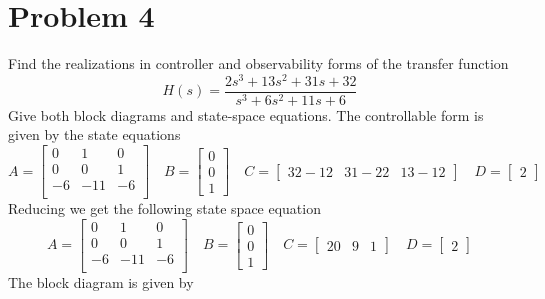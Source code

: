 \documentclass{article}
\begin{document}
\section*{Problem 4}
Find the realizations in controller and observability forms of the transfer function
$$ H(s) = \frac{2s^3+13s^2+31s+32}{s^3+6s^2+11s+6} $$
Give both block diagrams and state-space equations.
\newline
\newline
The controllable form is given by the state equations
$$
A =
\begin{bmatrix}
 0 &  1  &  0 \\
 0 &  0  &  1 \\
-6 & -11 & -6 \\
\end{bmatrix}
\quad
B =
\begin{bmatrix} 0 \\ 0 \\ 1 \end{bmatrix}
\quad
C =
\begin{bmatrix}
32 - 12 & 31 - 22 & 13 - 12
\end{bmatrix}
\quad
D =
\begin{bmatrix}
2
\end{bmatrix}
$$
Reducing we get the following state space equation
$$
A =
\begin{bmatrix}
 0 &  1  &  0 \\
 0 &  0  &  1 \\
-6 & -11 & -6 \\
\end{bmatrix}
\quad
B =
\begin{bmatrix} 0 \\ 0 \\ 1 \end{bmatrix}
\quad
C =
\begin{bmatrix}
20 & 9 & 1
\end{bmatrix}
\quad
D =
\begin{bmatrix}
2
\end{bmatrix}
$$
The block diagram is given by
\end{document}
